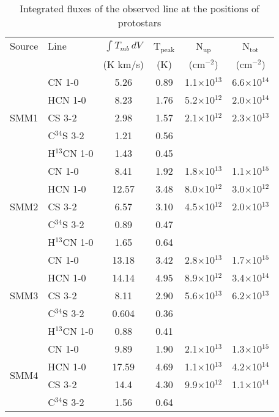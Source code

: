 \documentclass{aa}
\begin{document}
\begin{table*}
\caption{Integrated fluxes of the observed line at the positions of protostars}             %
\label{table:fluxes}      %
\centering                          %
\begin{tabular}{l l c c c c} 
\hline\hline 
Source & Line & $\int{T_{mb} \, dV}$ & T$_\mathrm{peak}$ & N$_\mathrm{up}$ & N$_\mathrm{tot}$\\
 &  & (K km/s) & (K) & (cm$^{-2}$) & (cm$^{-2}$) \\
\hline  
\multirow{5}{*}{SMM1} & CN 1-0 & 5.26 & 0.89 & 1.1$\times$10$^{13}$ & 6.6$\times$10$^{14}$\\
{} & HCN 1-0 & 8.23 & 1.76 & 5.2$\times$10$^{12}$ & 2.0$\times$10$^{14}$\\ 
{} & CS 3-2 & 2.98 & 1.57 & 2.1$\times$10$^{12}$ & 2.3$\times$10$^{13}$\\  
{} & C$^{34}$S 3-2 & 1.21 & 0.56 &  & \\ 
{} & H$^{13}$CN 1-0 & 1.43 & 0.45 &  & \\ 
\hline
\multirow{5}{*}{SMM2} & CN 1-0 & 8.41 & 1.92 & 1.8$\times$10$^{13}$ & 1.1$\times$10$^{15}$ \\
{} & HCN 1-0 & 12.57 & 3.48 & 8.0$\times$10$^{12}$ & 3.0$\times$10$^{12}$\\ 
{} & CS 3-2 & 6.57 & 3.10 & 4.5$\times$10$^{12}$ & 2.0$\times$10$^{13}$\\  
{} & C$^{34}$S 3-2 & 0.89 & 0.47 & &\\
{} & H$^{13}$CN 1-0 & 1.65 & 0.64 &  & \\ 
\hline
\multirow{5}{*}{SMM3} & CN 1-0 & 13.18 & 3.42 & 2.8$\times$10$^{13}$ & 1.7$\times$10$^{15}$\\
{} & HCN 1-0 & 14.14 & 4.95 & 8.9$\times$10$^{12}$ & 3.4$\times$10$^{14}$\\ 
{} & CS 3-2 & 8.11 & 2.90 & 5.6$\times$10$^{13}$ & 6.2$\times$10$^{13}$ \\  
{} & C$^{34}$S 3-2 & 0.604 & 0.36 &  & \\
{} & H$^{13}$CN 1-0 & 0.88 & 0.41 &  & \\ 
\hline
\multirow{5}{*}{SMM4} & CN 1-0 & 9.89 & 1.90 & 2.1$\times$10$^{13}$ & 1.3$\times$10$^{15}$\\
{} & HCN 1-0 & 17.59 & 4.69 & 1.1$\times$10$^{13}$ & 4.2$\times$10$^{14}$\\ 
{} & CS 3-2 & 14.4 & 4.30 & 9.9$\times$10$^{12}$ & 1.1$\times$10$^{14}$\\  
{} & C$^{34}$S 3-2 & 1.56 & 0.64 & &\\ 

\end{tabular}
\end{table*}
\end{document}
